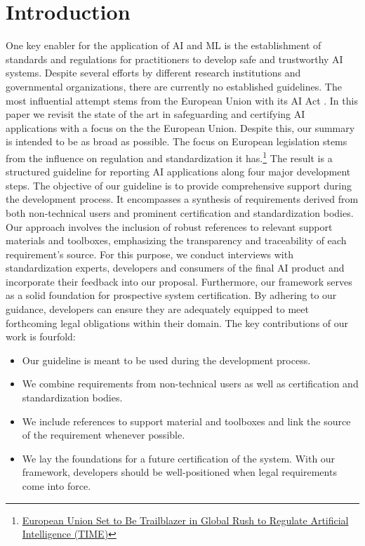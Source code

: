 \section{Introduction}
One key enabler for the application of \ac{AI} and \ac{ML} is the establishment of standards and regulations for practitioners to develop safe and trustworthy \ac{AI} systems. Despite several efforts by different research institutions and governmental organizations, there are  currently no established guidelines. The most influential attempt stems from the European Union with its AI Act \citep{AiAct}.  
In this paper we revisit  the state of the art in safeguarding and certifying AI applications with a focus on the the European Union. Despite this, our summary is intended to be as broad as possible. The focus on European legislation stems from the influence on regulation and standardization it has.\footnote{\href{https://time.com/6278144/european-union-artificial-intelligence-regulation/}{European Union Set to Be Trailblazer in Global Rush to Regulate Artificial Intelligence (TIME)}} 
The result is a structured guideline for reporting AI applications along four major development steps.
The objective of our guideline is to provide comprehensive support during the development process. It encompasses a synthesis of requirements derived from both non-technical users and prominent certification and standardization bodies. Our approach involves the inclusion of robust references to relevant support materials and toolboxes, emphasizing the transparency and traceability of each requirement's source. For this purpose, we conduct interviews with standardization experts, developers and consumers of the final AI product and incorporate their feedback into our proposal. Furthermore, our framework serves as a solid foundation for prospective system certification. By adhering to our guidance, developers can ensure they are adequately equipped to meet forthcoming legal obligations within their domain.
The key contributions of our work is fourfold: 
\begin{itemize}
    \item Our guideline is meant to be used during the development process. 
    \item We combine requirements from non-technical users as well as certification and standardization bodies.
    \item We include references to support material and toolboxes and link the source of the requirement whenever possible.
    \item We lay the foundations for a future certification of the system. With our framework, developers should be well-positioned when legal requirements  come into force.
\end{itemize}

